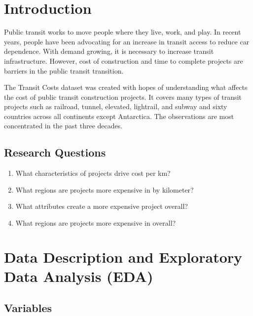 \documentclass[12pt]{article}
\begin{document}
\onehalfspacing %

\section{Introduction}

Public transit works to move people where they live, work, and play. In recent years, people have been advocating for an increase in transit access to reduce car dependence. With demand growing, it is necessary to increase transit infrastructure. However, cost of construction and time to complete projects are barriers in the public transit transition.

The Transit Costs dataset was created with hopes of understanding what affects the cost of public transit construction projects. It covers many types of transit projects such as railroad,  tunnel, elevated, lightrail, and subway and sixty countries across all continents except Antarctica. The observations are most concentrated in the past three decades.

\subsection{Research Questions}
\begin{enumerate}
    \itemsep-0.5em 
    \item What characteristics of projects drive cost per km? 
    \item What regions are projects more expensive in by kilometer?
    \item What attributes create a more expensive project overall?
    \item What regions are projects more expensive in overall?
\end{enumerate}

\section{Data Description and Exploratory Data Analysis (EDA)}

\subsection{Variables}
\end{document}
